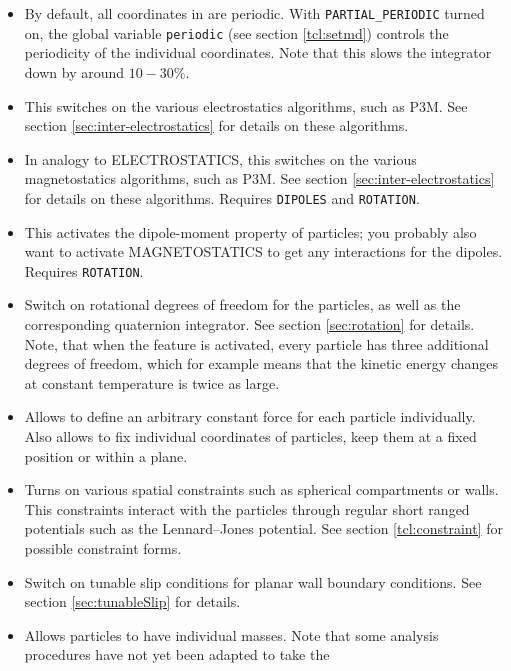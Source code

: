 \begin{itemize}
\item {} By default, all coordinates in \es{}
  are periodic. With \texttt{PARTIAL\_PERIODIC} turned on, the \es{}
  global variable \texttt{periodic} (see section \vref{tcl:setmd})
  controls the periodicity of the individual coordinates. Note that
  this slows the integrator down by around $10-30\%$.
\item {} This switches on the various
  electrostatics algorithms, such as P3M. See section
  \vref{sec:inter-electrostatics} for details on these algorithms.
\item {} In analogy to ELECTROSTATICS, this
  switches on the various magnetostatics algorithms, such as P3M.  See
  section \vref{sec:inter-electrostatics} for details on these
  algorithms.  Requires \texttt{DIPOLES} and \texttt{ROTATION}.
\item {} This activates the dipole-moment property of
  particles; you probably also want to activate MAGNETOSTATICS to get any
  interactions for the dipoles. Requires \texttt{ROTATION}.
\item {} Switch on rotational degrees of freedom for
  the particles, as well as the corresponding quaternion integrator.
  See section \vref{sec:rotation} for details. Note, that when the
  feature is activated, every particle has three additional degrees of
  freedom, which for example means that the kinetic energy changes at
  constant temperature is twice as large.
\item {} Allows to define an arbitrary
  constant force for each particle individually. Also allows to fix
  individual coordinates of particles, \eg keep them at a fixed
  position or within a plane.
\item {} Turns on various spatial constraints such
  as spherical compartments or walls. This constraints interact with
  the particles through regular short ranged potentials such as the
  Lennard--Jones potential. See section \vref{tcl:constraint} for
  possible constraint forms.
\item {} Switch on tunable slip conditions for
  planar wall boundary conditions. See section \vref{sec:tunableSlip}
  for details.
\item {} Allows particles to have individual masses. Note
  that some analysis procedures have not yet been adapted to take the

\end{itemize}
